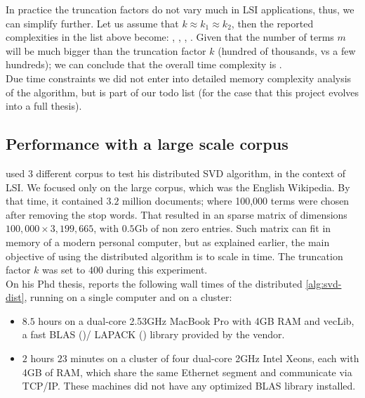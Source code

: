 In practice the truncation factors do not vary much in LSI
applications, thus, we can simplify further. Let us assume that $k
\approx k_1 \approx k_2$, then the reported complexities in the list
above become: , , , . Given that the number of terms $m$ will be much bigger than
the truncation factor $k$ (hundred of thousands, vs a few hundreds);
we can conclude that the overall time complexity is . \\

Due time constraints we did not enter into detailed memory complexity
analysis of the algorithm, but is part of our todo list (for the case
that this project evolves into a full thesis). 

\subsection{Performance with a large scale corpus}

\Rehurek used 3 different corpus to test his distributed SVD
algorithm, in the context of LSI. We focused only on the large corpus,
which was the English Wikipedia. By that time, it contained $3.2$
million documents; where 100,000 terms were chosen after removing the
stop words. That resulted in an sparse matrix of dimensions 
$100,000 \times 3,199,665$, with $0.5$Gb of non zero entries. Such
matrix can fit in memory of a modern personal computer, but as
explained earlier, the main objective of using the distributed
algorithm is to scale in time. The truncation factor $k$ was set to
$400$ during this experiment. \\

On his Phd thesis, \Rehurek reports the following wall times of the
distributed \cref{alg:svd-dist}, running on a single computer and on a
cluster: \\

\begin{itemize}
\item $8.5$ hours on a dual-core 2.53GHz MacBook Pro with 4GB RAM and
vecLib, a fast BLAS (\cite{blas})/ LAPACK (\cite{lapack}) library
provided by the vendor. \\ 

\item $2$ hours $23$ minutes on a cluster of four dual-core 2GHz Intel
  Xeons, each with 4GB of RAM, which share the same Ethernet segment
  and communicate via TCP/IP. These machines did not have any
  optimized BLAS library installed. 
\end{itemize}
\hfill

